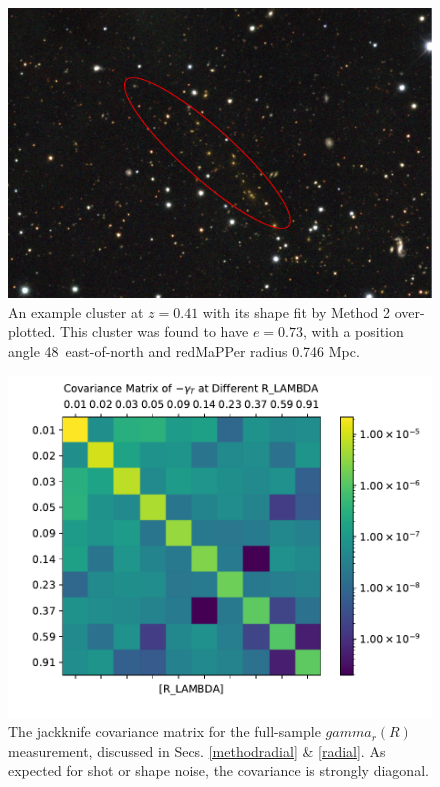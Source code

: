 \documentclass[fleqn,usenatbib]{mnras}
\begin{document}
\begin{figure}
\begin{center}
\includegraphics[width=\columnwidth]{cluster_example.png}
\end{center}
\caption[]{An example cluster at $z=0.41$ with its shape fit by Method 2 over-plotted. This cluster was found to have $e=0.73$, with a position angle 48\textdegree~east-of-north and redMaPPer radius 0.746 Mpc. 
\label{fig:cluster}}
\end{figure}


\begin{figure}
\begin{center}
\includegraphics[width=\columnwidth]{cov_lognorm.pdf}
\end{center}
\caption[]{The jackknife covariance matrix for the full-sample $gamma_r(R)$ measurement, discussed in Secs. \ref{methodradial} \& \ref{radial}. As expected for shot or shape noise, the covariance is strongly diagonal.
\label{fig:cov}}
\end{figure}
\end{document}
